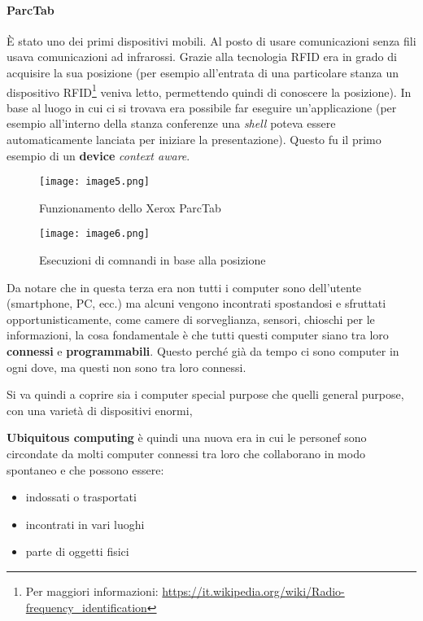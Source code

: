 \paragraph*{ParcTab} \`E stato uno dei primi dispositivi mobili. Al posto di
usare comunicazioni senza fili usava comunicazioni ad infrarossi. Grazie alla
tecnologia RFID era in grado di acquisire la sua posizione (per esempio
all'entrata di una particolare stanza un dispositivo RFID\footnote{Per
maggiori informazioni:
\url{https://it.wikipedia.org/wiki/Radio-frequency_identification}} veniva
letto, permettendo quindi di conoscere la posizione). In base al luogo in cui ci
si trovava era possibile far eseguire un'applicazione (per esempio all'interno
della stanza conferenze una \textit{shell} poteva essere automaticamente
lanciata per iniziare la presentazione). Questo fu il primo esempio di un
\textbf{device} \textit{context aware}.

\begin{figure}[H]
  \texttt{[image: image5.png]}
  \caption{Funzionamento dello Xerox ParcTab}
\endminipage \hspace{75pt}
  \texttt{[image: image6.png]}
  \caption{Esecuzioni di comnandi in base alla posizione}
\endminipage
\end{figure}

Da notare che in questa terza era non tutti i computer sono dell'utente
(smartphone, PC, ecc.) ma alcuni vengono incontrati spostandosi e
sfruttati opportunisticamente, come camere di sorveglianza, sensori,
chioschi per le informazioni, la cosa fondamentale è che tutti questi
computer siano tra loro \textbf{connessi} e \textbf{programmabili}.
Questo perché già da tempo ci sono computer in ogni dove, ma questi non
sono tra loro connessi.

Si va quindi a coprire sia i computer special purpose che quelli general
purpose, con una varietà di dispositivi enormi,

\textbf{Ubiquitous computing} è quindi una nuova era in cui le personef
sono circondate da molti computer connessi tra loro che collaborano in
modo spontaneo e che possono essere:

\begin{itemize}
\item indossati o trasportati
\item incontrati in vari luoghi
\item parte di oggetti fisici

\end{itemize}

